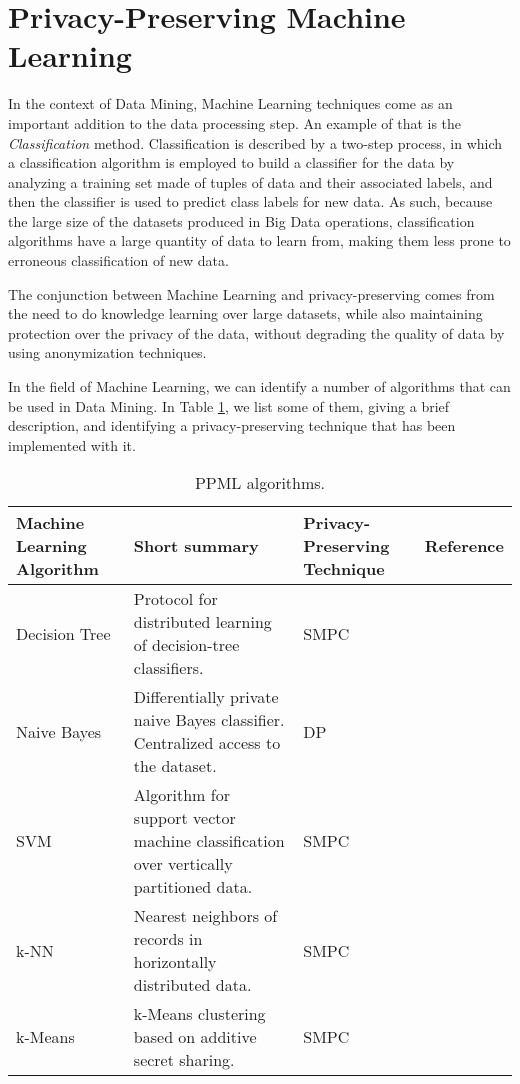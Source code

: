 \section{Privacy-Preserving Machine Learning}
\label{sec:PrivacyPreservingMachineLearning}


In the context of Data Mining, Machine Learning techniques come as an important addition to the data processing step. An example of that is the \textit{Classification} method. Classification is described by a two-step process, in which a classification algorithm is employed to build a classifier for the data by analyzing a training set made of tuples of data and their associated labels, and then the classifier is used to predict class labels for new data. As such, because the large size of the datasets produced in Big Data operations, classification algorithms have a large quantity of data to learn from, making them less prone to erroneous classification of new data.

The conjunction between Machine Learning and privacy-preserving comes from the need to do knowledge learning over large datasets, while also maintaining protection over the privacy of the data, without degrading the quality of data by using anonymization techniques.

In the field of Machine Learning, we can identify a number of algorithms that can be used in Data Mining. In Table \ref{table:ppml1}, we list some of them, giving a brief description, and identifying a privacy-preserving technique that has been implemented with it.

\begin{table}[H]
\centering
\caption{\ac{PPML} algorithms.}
\label{table:ppml1}
\begin{tabular}{|p{2.3cm}|p{5cm}|p{3.7cm}|l|}
\hline
\textbf{Machine Learning Algorithm} & \textbf{Short summary} & \textbf{Privacy-Preserving Technique} 
& \textbf{Reference} \\ \hline
Decision Tree & Protocol for distributed learning of decision-tree classifiers. & \ac{SMPC} & \cite{brickell2009privacy} \\ \hline
Naive Bayes & Differentially private naive Bayes classifier. Centralized access to the dataset. & \ac{DP}   & 
\cite{vaidya2013differentially} \\ \hline
\acs{SVM}  &Algorithm for support vector machine classification over vertically partitioned data. & \ac{SMPC} &   
\cite{yu2006privacy} \\ \hline
\acs{k-NN}  & Nearest neighbors of records in horizontally distributed data. & \ac{SMPC}  &
\cite{shaneck2006privacy} \\ \hline
k-Means & k-Means clustering based on additive secret sharing. & \ac{SMPC}  & 
\cite{doganay2008distributed}                    \\\hline
\end{tabular}
\end{table}



